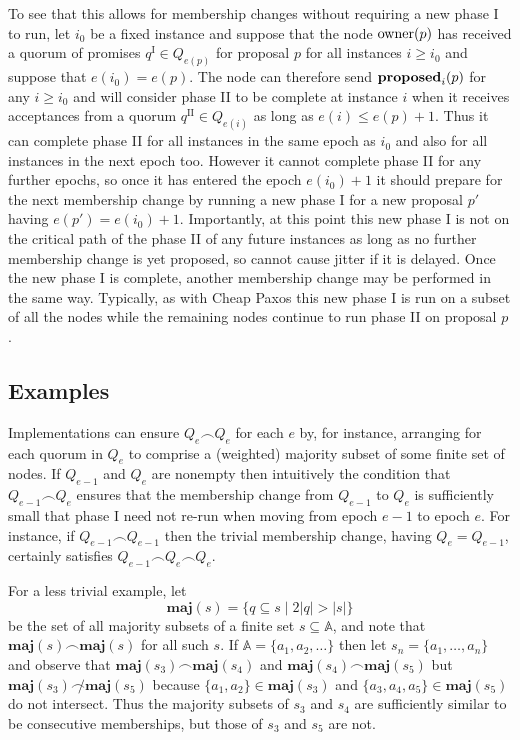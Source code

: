 \documentclass[journal]{IEEEtran}
\begin{document}
To see that this allows for membership changes without requiring a new phase I
to run, let $i_0$ be a fixed instance and suppose that the node $\mathrm{owner}(p)$ has
received a quorum of promises $q^\textrm{I} \in Q_{e(p)}$ for proposal $p$ for
all instances $i \ge i_0$ and suppose that $e(i_0) = e(p)$. The node can
therefore send $\mathbf{proposed}_{i}(p)$ for any $i \ge i_0$ and will consider phase II to
be complete at instance $i$ when it receives acceptances from a quorum
$q^\textrm{II} \in Q_{e(i)}$ as long as $e(i) \le e(p) + 1$. Thus it can
complete phase II for all instances in the same epoch as $i_0$ and also for all
instances in the next epoch too.  However it cannot complete phase II for any
further epochs, so once it has entered the epoch $e(i_0) + 1$ it should prepare
for the next membership change by running a new phase I for a new proposal $p'$
having $e(p') = e(i_0) + 1$. Importantly, at this point this new phase I is not
on the critical path of the phase II of any future instances as long as no
further membership change is yet proposed, so cannot cause jitter if it is
delayed. Once the new phase I is complete, another membership change may be
performed in the same way. Typically, as with Cheap Paxos\cite{cheap-paxos}
this new phase I is run on a subset of all the nodes while the remaining nodes
continue to run phase II on proposal $p$.

\subsection{Examples}\label{types-of-membership-change}

\def\maj#1{\mathbf{maj}(#1)}

Implementations can ensure $Q_e \frown Q_e$ for each $e$ by, for instance,
arranging for each quorum in $Q_e$ to comprise a (weighted) majority subset of
some finite set of nodes.  If $Q_{e-1}$ and $Q_e$ are nonempty then intuitively
the condition that $Q_{e-1} \frown Q_e$ ensures that the membership change from
$Q_{e-1}$ to $Q_e$ is sufficiently small that phase I need not re-run when
moving from epoch $e-1$ to epoch $e$.  For instance, if $Q_{e-1} \frown
Q_{e-1}$ then the trivial membership change, having $Q_e = Q_{e-1}$, certainly
satisfies $Q_{e-1} \frown Q_e \frown Q_e$.

For a less trivial example, let \[\maj{s} = \{ q \subseteq s \mid 2 |q| > |s|
\}\] be the set of all majority subsets of a finite set $s \subseteq \mathbb
A$, and note that $\maj{s} \frown \maj{s}$ for all such $s$.  If $\mathbb A =
\{ a_1, a_2, \ldots \}$ then let $s_n = \{a_1, \ldots, a_n\}$ and observe that
${\maj{s_3} \frown \maj{s_4}}$ and ${\maj{s_4} \frown \maj{s_5}}$ but ${\maj{s_3}
\not\frown \maj{s_5}}$ because $\{a_1, a_2\} \in \maj{s_3}$ and $\{a_3, a_4,
a_5\} \in \maj{s_5}$ do not intersect. Thus the majority subsets of $s_3$ and
$s_4$ are sufficiently similar to be consecutive memberships, but those of
$s_3$ and $s_5$ are not.
\end{document}
